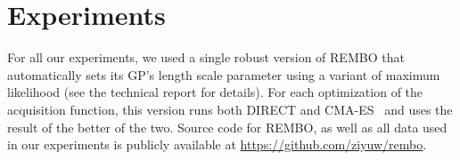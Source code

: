 \documentclass{article}
\newcommand{\note}[1]{}
\renewcommand{\note}[1]{~\\\frame{\begin{minipage}[c]{0.48\textwidth}\vspace{2pt}\center{#1}\vspace{2pt}\end{minipage}}\vspace{3pt}\\}
\begin{document}
\section{Experiments}\label{sec:experiments}


%

For all our experiments, we used a single robust version of REMBO that automatically sets its GP's length scale parameter using a variant of maximum likelihood (see the technical report \cite{WanEtAl13:REMBO_arXiv} for details).
For each optimization of the acquisition function, this version runs both DIRECT \cite{Jones:1993} and CMA-ES~\cite{Hansen:2001:CDS:1108839.1108843} and uses the result of the better of the two.
Source code for REMBO, as well as all data used in our experiments is publicly available at \url{https://github.com/ziyuw/rembo}.

%
\end{document}
